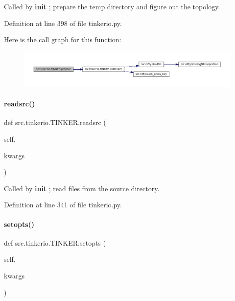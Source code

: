 Called by {\bfseries init} ; prepare the temp directory and figure out the topology. 



Definition at line 398 of file tinkerio.\+py.

Here is the call graph for this function\+:
\nopagebreak
\begin{figure}[H]
\begin{center}
\leavevmode
\includegraphics[width=350pt]{classsrc_1_1tinkerio_1_1TINKER_ae792345131bcdde1062bec5ab20ff7ea_cgraph}
\end{center}
\end{figure}
\mbox{\label{classsrc_1_1tinkerio_1_1TINKER_afb70e7572374ef07483aacd2d14195b1}} 
\paragraph{\texorpdfstring{readsrc()}{readsrc()}}
{\footnotesize\ttfamily def src.\+tinkerio.\+T\+I\+N\+K\+E\+R.\+readsrc (\begin{DoxyParamCaption}\item[{}]{self,  }\item[{}]{kwargs }\end{DoxyParamCaption})}



Called by {\bfseries init} ; read files from the source directory. 



Definition at line 341 of file tinkerio.\+py.

\mbox{\label{classsrc_1_1tinkerio_1_1TINKER_a896aacb11fbb0f3eb03268d5ad08cbae}} 
\paragraph{\texorpdfstring{setopts()}{setopts()}}
{\footnotesize\ttfamily def src.\+tinkerio.\+T\+I\+N\+K\+E\+R.\+setopts (\begin{DoxyParamCaption}\item[{}]{self,  }\item[{}]{kwargs }\end{DoxyParamCaption})}



